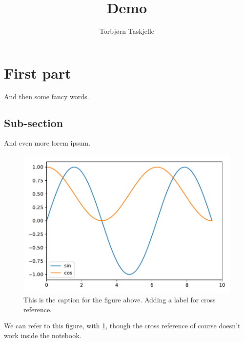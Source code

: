\documentclass{scrartcl}
\author{Torbjørn Taskjelle}\title{Demo}
\begin{document}
\maketitle






\section{First part}\label{first-part}

And then some fancy words.

\subsection{Sub-section}\label{sub-section}

And even more lorem ipsum.




\begin{figure}
\centering
\includegraphics{demofig}
\caption{This is the caption for the figure above. Adding a label for
cross reference. \label{fig:demo}}
\end{figure}

We can refer to this figure, with \ref{fig:demo}, though the cross
reference of course doesn't work inside the notebook.
\end{document}
